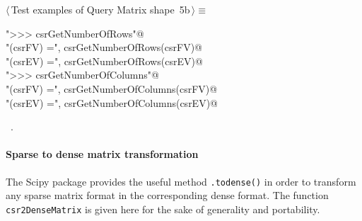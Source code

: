 \documentclass[11pt,oneside]{article}	%
\begin{document}
\begin{flushleft} \small \label{scrap9}
\protect{}$\langle\,$Test examples of Query Matrix shape\nobreak\ {\footnotesize 5b}$\,\rangle\equiv$
\vspace{-1ex}
\begin{list}{}{} \item
\mbox{}\verb@print "\n>>> csrGetNumberOfRows"@\\
\mbox{}\verb@print "\ncsrGetNumberOfRows(csrFV) =", csrGetNumberOfRows(csrFV)@\\
\mbox{}\verb@print "\ncsrGetNumberOfRows(csrEV) =", csrGetNumberOfRows(csrEV)@\\
\mbox{}\verb@print "\n>>> csrGetNumberOfColumns"@\\
\mbox{}\verb@print "\ncsrGetNumberOfColumns(csrFV) =", csrGetNumberOfColumns(csrFV)@\\
\mbox{}\verb@print "\ncsrGetNumberOfColumns(csrEV) =", csrGetNumberOfColumns(csrEV)@\\
\mbox{}\verb@@{\NWsep}
\end{list}
\vspace{-1ex}
\footnotesize\addtolength{\baselineskip}{-1ex}
\begin{list}{}{\setlength{\itemsep}{-\parsep}\setlength{\itemindent}{-\leftmargin}}
\item \NWtxtMacroRefIn\ .
\end{list}
\end{flushleft}

\paragraph{Sparse to dense matrix transformation}
The Scipy package provides the useful method \texttt{.todense()} in order to transform any sparse matrix format in the corresponding dense format. The function \texttt{csr2DenseMatrix} is given here for the sake of generality and portability.
\end{document}
